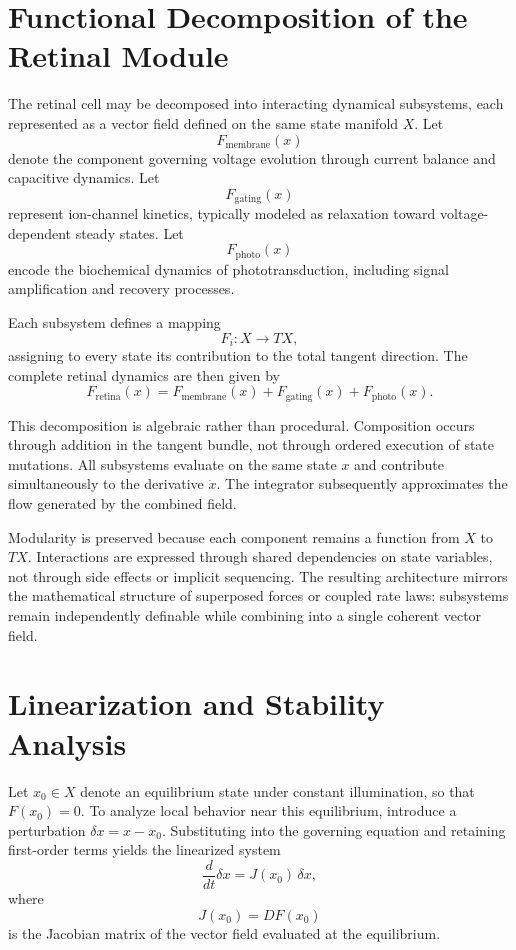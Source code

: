 \documentclass[12pt]{book}
\begin{document}
\section{Functional Decomposition of the Retinal Module}

The retinal cell may be decomposed into interacting dynamical
subsystems, each represented as a vector field defined on the same
state manifold $X$. Let
\[
F_{\text{membrane}}(x)
\]
denote the component governing voltage evolution through current
balance and capacitive dynamics. Let
\[
F_{\text{gating}}(x)
\]
represent ion-channel kinetics, typically modeled as relaxation
toward voltage-dependent steady states. Let
\[
F_{\text{photo}}(x)
\]
encode the biochemical dynamics of phototransduction, including
signal amplification and recovery processes.

Each subsystem defines a mapping
\[
F_i : X \to TX,
\]
assigning to every state its contribution to the total tangent
direction. The complete retinal dynamics are then given by
\[
F_{\text{retina}}(x)
=
F_{\text{membrane}}(x)
+
F_{\text{gating}}(x)
+
F_{\text{photo}}(x).
\]

This decomposition is algebraic rather than procedural. Composition
occurs through addition in the tangent bundle, not through ordered
execution of state mutations. All subsystems evaluate on the same
state $x$ and contribute simultaneously to the derivative
$\dot{x}$. The integrator subsequently approximates the flow generated
by the combined field.

Modularity is preserved because each component remains a function
from $X$ to $TX$. Interactions are expressed through shared
dependencies on state variables, not through side effects or
implicit sequencing. The resulting architecture mirrors the
mathematical structure of superposed forces or coupled rate laws:
subsystems remain independently definable while combining into a
single coherent vector field.

\section{Linearization and Stability Analysis}

Let $x_0 \in X$ denote an equilibrium state under constant illumination,
so that $F(x_0) = 0$. To analyze local behavior near this equilibrium,
introduce a perturbation $\delta x = x - x_0$. Substituting into the
governing equation and retaining first-order terms yields the linearized
system
\[
\frac{d}{dt} \delta x
=
J(x_0)\,\delta x,
\]
where
\[
J(x_0) = DF(x_0)
\]
is the Jacobian matrix of the vector field evaluated at the equilibrium.
\end{document}
